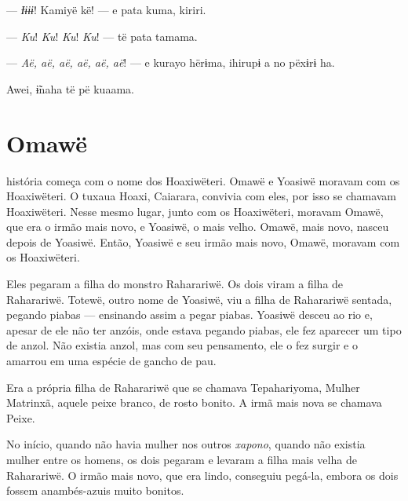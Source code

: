 --- \textit{Ɨɨɨɨ}! Kamiyë kë! --- e pata kuma, kiriri. 


--- \textit{Ku}! \textit{Ku}! \textit{Ku}! \textit{Ku}! --- të pata tamama. 


--- \textit{Aë, aë, aë, aë, aë, aë}! --- e kurayo hërɨma, ihirupɨ a no pëxɨrɨ ha. 

Awei, ɨ̃naha të pë kuaama. 

\chapter{Omawë}

 história começa com o nome dos Hoaxiwëteri. Omawë e Yoasiwë moravam
com os Hoaxiwëteri. O tuxaua Hoaxi, Caiarara, convivia com eles, por isso se
chamavam Hoaxiwëteri. Nesse mesmo lugar, junto com os Hoaxiwëteri,
moravam Omawë, que era o irmão mais novo, e Yoasiwë, o mais velho.
Omawë, mais novo, nasceu depois de Yoasiwë. Então, Yoasiwë e seu irmão
mais novo, Omawë, moravam com os Hoaxiwëteri.

Eles pegaram a filha do monstro Raharariwë. Os dois viram a filha de
Raharariwë. Totewë, outro nome de Yoasiwë, viu a filha de Raharariwë
sentada, pegando piabas --- ensinando assim a pegar piabas. Yoasiwë
desceu ao rio e, apesar de ele não ter anzóis, onde estava pegando
piabas, ele fez aparecer um tipo de anzol. Não existia anzol, mas com
seu pensamento, ele o fez surgir e o amarrou em uma espécie de gancho de pau.


Era a própria filha de Raharariwë que se chamava Tepahariyoma, Mulher Matrinxã, 
aquele peixe branco, de rosto bonito. A irmã mais nova se chamava Peixe. 

No início, quando não havia mulher nos outros \textit{xapono}, quando não existia
mulher entre os homens, os dois pegaram e levaram a filha mais velha de
Raharariwë. O irmão mais novo, que era lindo, conseguiu pegá-la, embora
os dois fossem anambés-azuis muito bonitos. 

